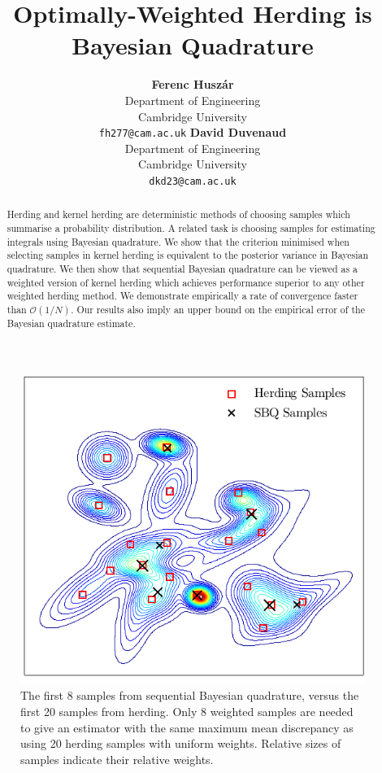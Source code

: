 \documentclass[]{article}
\title{Optimally-Weighted Herding is Bayesian Quadrature}
\author{
 {\bf Ferenc Husz\'{a}r} \\
Department of Engineering\\
Cambridge University\\ 
\texttt{fh277@cam.ac.uk}
\And 
{\bf David Duvenaud } \\ %
Department of Engineering\\ 
Cambridge University \\
\texttt{dkd23@cam.ac.uk}
}
\begin{document}
 
 
\maketitle 
 
\begin{abstract} 
Herding and kernel herding are deterministic methods of choosing samples which summarise a probability distribution.  A related task is choosing samples for estimating integrals using Bayesian quadrature.  We show that the criterion minimised when selecting samples in kernel herding is equivalent to the posterior variance in Bayesian quadrature.  We then show that sequential Bayesian quadrature can be viewed as a weighted version of kernel herding which achieves performance superior to any other weighted herding method. We demonstrate empirically a rate of convergence faster than $\mathcal{O}(1/N)$.  Our results also imply an upper bound on the empirical error of the Bayesian quadrature estimate.
\end{abstract} 

\begin{figure}[h]
\centering
\includegraphics[width=\columnwidth]{figures/fig1_v2}
\caption{The first 8 samples from sequential Bayesian quadrature, versus the first 20 samples from herding.  Only 8 weighted \sbq{} samples are needed to give an estimator with the same maximum mean discrepancy as using 20 herding samples with uniform weights.  Relative sizes of samples indicate their relative weights.}
\label{fig:fig1}
\end{figure} 
\end{document}
